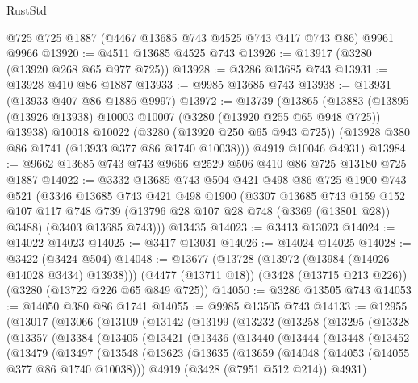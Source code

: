 \begin{lexlean}{RustStd}
\begin{coremodule}
    @725
    @725
    @1887
    (@4467 @13685 @743 @4525 @743 @417 @743 @86)
    @9961
    @9966
@13920 := @4511 @13685 @4525 @743
@13926 := @13917 (@3280 (@13920 @268 @65 @977 @725))
@13928 := @3286 @13685 @743
@13931 := @13928 @410 @86 @1887
@13933 := @9985 @13685 @743
@13938 := @13931 (@13933 @407 @86 @1886 @9997)
@13972 := @13739
    (@13865
      (@13883
        (@13895 (@13926 @13938) @10003 @10007 (@3280 (@13920 @255 @65 @948 @725)) @13938)
        @10018
        @10022
        (@3280 (@13920 @250 @65 @943 @725))
        (@13928 @380 @86 @1741 (@13933 @377 @86 @1740 @10038)))
      @4919
      @10046
      @4931)
@13984 := @9662 @13685 @743 @743 @9666 @2529 @506 @410 @86 @725 @13180 @725 @1887
@14022 := @3332
    @13685
    @743
    @504
    @421
    @498
    @86
    @725
    @1900
    @743
    @521
    (@3346
      @13685
      @743
      @421
      @498
      @1900
      (@3307
        @13685
        @743
        @159
        @152
        @107
        @117
        @748
        @739
        (@13796 @28 @107 @28 @748 (@3369 (@13801 @28)) @3488)
        (@3403 @13685 @743)))
    @13435
@14023 := @3413 @13023
@14024 := @14022 @14023
@14025 := @3417 @13031
@14026 := @14024 @14025
@14028 := @3422 (@3424 @504)
@14048 := @13677
    (@13728 (@13972 (@13984 (@14026 @14028 @3434) @13938)))
    (@4477 (@13711 @18))
    (@3428 (@13715 @213 @226))
    (@3280 (@13722 @226 @65 @849 @725))
@14050 := @3286 @13505 @743
@14053 := @14050 @380 @86 @1741
@14055 := @9985 @13505 @743
@14133 := @12955
    (@13017
      (@13066
        (@13109
          (@13142
            (@13199
              (@13232
                (@13258
                  (@13295
                    (@13328
                      (@13357
                        (@13384
                          (@13405
                            (@13421
                              (@13436
                                (@13440
                                  (@13444
                                    (@13448
                                      (@13452
                                        (@13479
                                          (@13497
                                            (@13548
                                              (@13623
                                                (@13635
                                                  (@13659
                                                    (@14048 (@14053 (@14055 @377 @86 @1740 @10038)))
                                                    @4919
                                                    (@3428 (@7951 @512 @214))
                                                    @4931)

\end{coremodule}
\end{lexlean}
